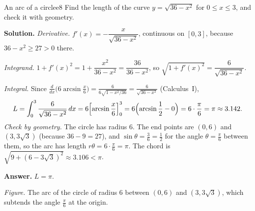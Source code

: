 \documentclass[11pt]{article}
\begin{document}
\begin{exmp}{An arc of a circle}{e8}
Find the length of the curve $y=\sqrt{36-x^2}$ for $0\le x\le3$, and check it with geometry.

\textbf{Solution.} \emph{Derivative.} $f'(x)=-\dfrac x{\sqrt{36-x^2}}$, continuous on $[0,3]$, because $36-x^2\ge27>0$ there.

\emph{Integrand.} $1+f'(x)^2=1+\dfrac{x^2}{36-x^2}=\dfrac{36}{36-x^2}$, so $\sqrt{1+f'(x)^2}=\dfrac6{\sqrt{36-x^2}}$.

\emph{Integral.} Since $\frac d{dx}\bigl(6\arcsin\frac x6\bigr)=\frac6{6\sqrt{1-x^2/36}}=\frac6{\sqrt{36-x^2}}$ (Calculus~I),
\[
L=\int_0^3\frac6{\sqrt{36-x^2}}\,dx=6\Bigl[\arcsin\frac x6\Bigr]_0^3=6\Bigl(\arcsin\frac12-0\Bigr)=6\cdot\frac\pi6=\pi\approx3.142 .
\]
\emph{Check by geometry.} The circle has radius $6$. The end points are $(0,6)$ and $(3,3\sqrt3)$ (because $36-9=27$), and $\sin\theta=\frac36=\frac12$ for the angle $\theta=\frac\pi6$ between them, so the arc has length $r\theta=6\cdot\frac\pi6=\pi$. The chord is $\sqrt{9+(6-3\sqrt3)^2}\approx3.106<\pi$.

\textbf{Answer.} $L=\pi$.
\begin{center}
\par\small\emph{Figure.} The arc of the circle of radius $6$ between $(0,6)$ and $(3,3\sqrt3)$, which subtends the angle $\frac\pi6$ at the origin.
\end{center}
\end{exmp}
\end{document}
